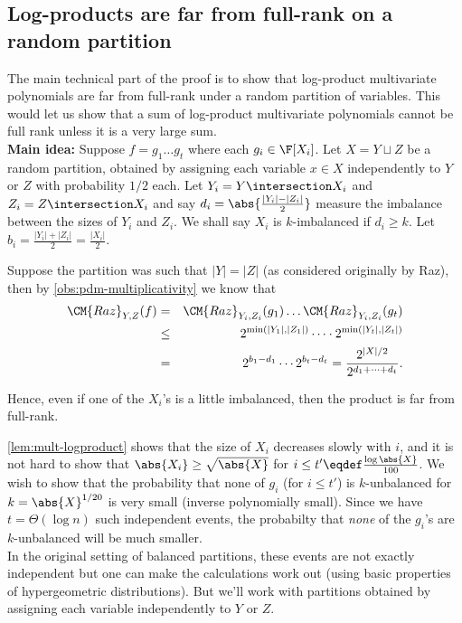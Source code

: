 \subsection{Log-products are far from full-rank on a random
  partition}

The main technical part of the proof is to show that log-product multivariate polynomials are far from full-rank under a random partition of variables. 
This would let us show that a sum of log-product multivariate polynomials cannot be full rank unless it is a very large sum.\\

{\bf Main idea: } Suppose $f = g_1 \dots g_t$ where each $g_i \in \F[X_i]$. 
Let $X = Y \sqcup Z$ be a random partition, obtained by assigning each variable $x\in X$ independently to $Y$ or $Z$ with probability $1/2$ each. 
Let $Y_i = Y \intersection X_i$ and $Z_i = Z \intersection X_i$ and say $d_i = \abs{\frac{|Y_i| - |Z_i|}{2}}$ measure the imbalance between the sizes of $Y_i$ and $Z_i$. We shall say $X_i$ is $k$-imbalanced if $d_i \geq k$. 
Let $b_i = \frac{|Y_i| + |Z_i|}{2} = \frac{|X_i|}{2}$.

Suppose the partition was such that $|Y| = |Z|$ (as considered originally by Raz), then by \autoref{obs:pdm-multiplicativity} we know that 
\begin{eqnarray*}
\CM{Raz}_{Y,Z}(f) & = & \CM{Raz}_{Y_i,Z_i}(g_1) \dots \CM{Raz}_{Y_i,Z_i}(g_t)\\
 & \leq & 2^{\min(|Y_1|,|Z_1|)} \cdots  \cdot 2^{\min(|Y_t|,|Z_t|)}\\ 
 & = & 2^{b_1  - d_1} \cdots 2^{b_t - d_t} = \frac{2^{|X|/2}}{2^{d_1 + \dots + d_t}}.
\end{eqnarray*}

Hence, even if one of the $X_i$'s is a little imbalanced, then the product is far from full-rank. 

\autoref{lem:mult-logproduct} shows that the size of $X_i$ decreases slowly with $i$, and it is not hard to show that $\abs{X_i} \geq \sqrt{\abs{X}}$ for $i \leq t'\eqdef\frac{\log{\abs{X}}}{100}$. 
We wish to show that the probability that none of $g_i$ (for $i\leq t'$) is $k$-unbalanced for $k = \abs{X}^{1/20}$ is very small (inverse polynomially small). Since we have $t = \Theta(\log n)$ such independent events, the probabilty that \emph{none} of the $g_i$'s are $k$-unbalanced will be much smaller. \\

In the original setting of balanced partitions, these events are not exactly independent but one can make the calculations work out (using basic properties of hypergeometric distributions). But we'll work with partitions obtained by assigning each variable independently to $Y$ or $Z$. 


